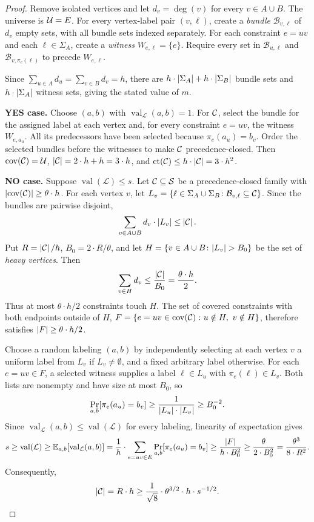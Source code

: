 \begin{proof}
    Remove isolated vertices and let $d_v=\deg(v)$ for every $v\in A\cup B$. The universe is $\mathcal{U}=E$. For every vertex-label pair $(v,\ell)$, create a \emph{bundle} $\mathcal B_{v,\ell}$ of $d_v$ empty sets, with all bundle sets indexed separately. For each constraint $e=uv$ and each $\ell\in\Sigma_A$, create a \emph{witness} $W_{e,\ell}=\{e\}$. Require every set in $\mathcal B_{u,\ell}$ and $\mathcal B_{v,\pi_e(\ell)}$ to precede $W_{e,\ell}$.

    Since $\sum_{u\in A}d_u=\sum_{v\in B}d_v=h$, there are $h\cdot\mathopen{}\left| \Sigma_A \right|+h\cdot\mathopen{}\left| \Sigma_B \right|$ bundle sets and $h\cdot\mathopen{}\left| \Sigma_A \right|$ witness sets, giving the stated value of $m$.

    \par\noindent\textbf{YES case.}
    Choose $(a,b)$ with $\operatorname{val}_{\mathcal L}(a,b)=1$. For $\mathcal{C}$, select the bundle for the assigned label at each vertex and, for every constraint $e=uv$, the witness $W_{e,a_u}$. All its predecessors have been selected because $\pi_e(a_u)=b_v$. Order the selected bundles before the witnesses to make $\mathcal{C}$ precedence-closed. Then $\operatorname{cov}\mathopen{}\left( \mathcal{C} \right)=\mathcal{U}$, $\mathopen{}\left| \mathcal{C} \right|=2\cdot h+h=3\cdot h$, and $\operatorname{ct}\mathopen{}\left( \mathcal{C} \right)\leq h\cdot\mathopen{}\left| \mathcal{C} \right|=3\cdot h^2$.

    \par\noindent\textbf{NO case.}
    Suppose $\operatorname{val}(\mathcal L)\leq s$. Let $\mathcal{C}\subseteq\mathcal{S}$ be a precedence-closed family with $\mathopen{}\left| \operatorname{cov}\mathopen{}\left( \mathcal{C} \right) \right|\geq\theta\cdot h$. For each vertex $v$, let $L_v=\mathopen{}\left\{ \ell\in\Sigma_A\cup\Sigma_B\colon \mathcal B_{v,\ell}\subseteq\mathcal{C} \right\}$. Since the bundles are pairwise disjoint,
    \[
        \sum_{v\in A\cup B}d_v\cdot\mathopen{}\left| L_v \right|\leq\mathopen{}\left| \mathcal{C} \right|.
    \]
    Put $R=\mathopen{}\left| \mathcal{C} \right|/h$, $B_0=2\cdot R/\theta$, and let $H=\{v\in A\cup B\colon \spr{L_v}>B_0\}$ be the set of \emph{heavy vertices}. Then
    \[
        \sum_{v\in H}d_v\leq\frac{\mathopen{}\left| \mathcal{C} \right|}{B_0}=\frac{\theta\cdot h}{2}.
    \]
    Thus at most $\theta\cdot h/2$ constraints touch $H$. The set of covered constraints with both endpoints outside of $H$, $F=\{e=uv\in\cov\br{\cC}\colon u\notin H,\ v\notin H\}$, therefore satisfies $\mathopen{}\left| F \right|\geq\theta\cdot h/2$.

    Choose a random labeling $(a,b)$ by independently selecting at each vertex $v$ a uniform label from $L_v$ if $L_v\neq\emptyset$, and a fixed arbitrary label otherwise. For each $e=uv\in F$, a selected witness supplies a label $\ell\in L_u$ with $\pi_e(\ell)\in L_v$. Both lists are nonempty and have size at most $B_0$, so
    \[
        \Pr_{a,b}[\pi_e(a_u)=b_v]
        \geq\frac{1}{\mathopen{}\left| L_u \right|\cdot\mathopen{}\left| L_v \right|}\geq B_0^{-2}.
    \]
    Since $\operatorname{val}_{\mathcal L}(a,b)\leq\operatorname{val}(\mathcal L)$ for every labeling, linearity of expectation gives
    \[
        s\geq\operatorname{val}(\mathcal L)
        \geq\mathbb{E}_{a,b}[\operatorname{val}_{\mathcal L}(a,b)]
        =\frac1h\cdot\sum_{e=uv\in E}\Pr_{a,b}[\pi_e(a_u)=b_v]
        \geq\frac{\mathopen{}\left| F \right|}{h\cdot B_0^2}\geq\frac{\theta}{2\cdot B_0^2}
        =\frac{\theta^3}{8\cdot R^2}.
    \]
    Consequently,
    \[
        \mathopen{}\left| \mathcal{C} \right|=R\cdot h\geq\frac{1}{\sqrt8}\cdot\theta^{3/2}\cdot h\cdot s^{-1/2}.
    \]


\end{proof}
